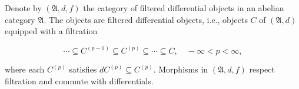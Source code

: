Denote by $(\mathfrak{A}, d, f)$ the category of filtered differential objects in an abelian category $\mathfrak{A}$. The objects are filtered differential objects, i.e., objects $C$ of $(\mathfrak{A}, d)$ equipped with a filtration

$$\cdots \subseteq C^{(p-1)} \subseteq C^{(p)} \subseteq \cdots \subseteq C, \quad -\infty < p < \infty,$$

where each $C^{(p)}$ satisfies $dC^{(p)} \subseteq C^{(p)}$. Morphisms in $(\mathfrak{A}, d, f)$ respect filtration and commute with differentials.
